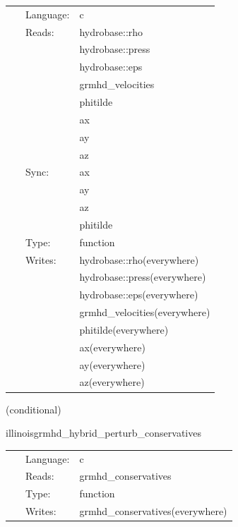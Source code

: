 \hspace{5mm}

 \begin{tabular*}{160mm}{cll} 
~ & Language:  & c \\ 
~ & Reads:  & hydrobase::rho \\ 
~& ~ &hydrobase::press\\ 
~& ~ &hydrobase::eps\\ 
~& ~ &grmhd\_velocities\\ 
~& ~ &phitilde\\ 
~& ~ &ax\\ 
~& ~ &ay\\ 
~& ~ &az\\ 
~ & Sync:  & ax \\ 
~& ~ &ay\\ 
~& ~ &az\\ 
~& ~ &phitilde\\ 
~ & Type:  & function \\ 
~ & Writes:  & hydrobase::rho(everywhere) \\ 
~& ~ &hydrobase::press(everywhere)\\ 
~& ~ &hydrobase::eps(everywhere)\\ 
~& ~ &grmhd\_velocities(everywhere)\\ 
~& ~ &phitilde(everywhere)\\ 
~& ~ &ax(everywhere)\\ 
~& ~ &ay(everywhere)\\ 
~& ~ &az(everywhere)\\ 
\end{tabular*} 


\vspace{5mm}

   (conditional) 

\hspace{5mm} illinoisgrmhd\_hybrid\_perturb\_conservatives 

\hspace{5mm}{\it hybrid version of illinoisgrmhd\_perturb\_conservatives } 


\hspace{5mm}

 \begin{tabular*}{160mm}{cll} 
~ & Language:  & c \\ 
~ & Reads:  & grmhd\_conservatives \\ 
~ & Type:  & function \\ 
~ & Writes:  & grmhd\_conservatives(everywhere) \\ 
\end{tabular*} 


